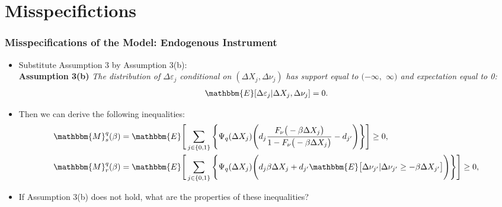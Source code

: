 \documentclass[notes=show]{beamer}
\begin{document}
\section{Misspecifictions}
\begin{frame}
\frametitle{Misspecifications of the Model: Endogenous Instrument}

\begin{itemize}
	\item Substitute Assumption 3 by Assumption 3(b):\\
	\bigskip
	\textbf{Assumption 3(b)} \textit{The distribution of $\Delta\varepsilon_{j}$ conditional on $(\Delta X_{j},\Delta \nu_{j})$ has support equal to $(-\infty,$ $\infty)$ and expectation equal to 0:
	\begin{align*}
	\mathbbm{E}[\Delta\varepsilon_{j}|\Delta X_{j},\Delta \nu_{j}]=0.
	\end{align*}}
	\item Then we can derive the following inequalities:
	\small
	\begin{align*}
	\mathbbm{M}^{q}_{s}(\beta)&=\mathbbm{E}\Bigg[\sum_{j\in\{0,1\}}\Bigg\{\Psi_{q}(\Delta X_{j})\Bigg(d_{j}\frac{F_{\nu}\big(-\beta\Delta X_{j}\big)}{1-F_{\nu}\big(-\beta\Delta X_{j}\big)}-d_{j'}\Bigg)\Bigg\}\Bigg]\geq 0,\\
	\mathbbm{M}^{q}_{r}(\beta)&=\mathbbm{E}\Bigg[\sum_{j\in\{0,1\}}\Bigg\{\Psi_{q}(\Delta X_{j})\Bigg(d_{j}\beta\Delta X_{j}+d_{j'}\mathbbm{E}\big[\Delta\nu_{j'}|\Delta\nu_{j'}\geq-\beta\Delta X_{j'}\big]\Bigg)\Bigg\}\Bigg]\geq 0,
	\end{align*}
	\normalsize
	\item If Assumption 3(b) does not hold, what are the properties of these inequalities?
\end{itemize}
\end{frame}
\end{document}
